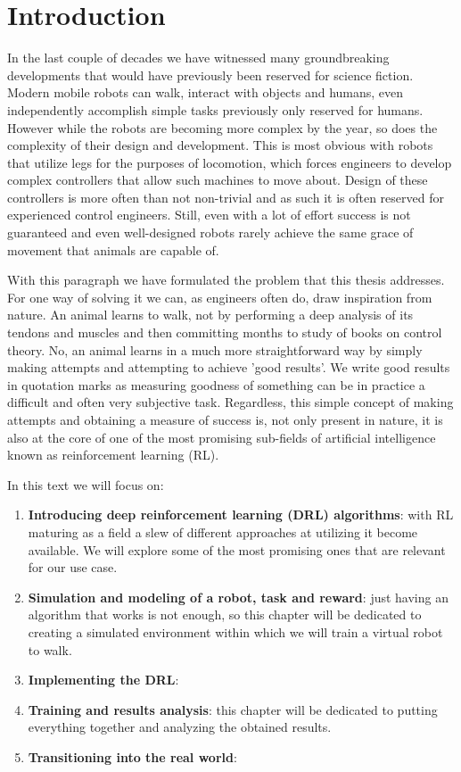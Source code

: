 \chapter{Introduction}


In the last couple of decades we have witnessed many groundbreaking developments that would have previously been reserved for science fiction. Modern mobile robots can walk, interact with objects and humans, even independently accomplish simple tasks previously only reserved for humans. However while the robots are becoming more complex by the year, so does the complexity of their design and development. This is most obvious with robots that utilize legs for the purposes of locomotion, which forces engineers to develop complex controllers that allow such machines to move about. Design of these controllers is more often than not non-trivial and as such it is often reserved for experienced control engineers. Still, even with a lot of effort success is not guaranteed and even well-designed robots rarely achieve the same grace of movement that animals are capable of.

With this paragraph we have formulated the problem that this thesis addresses. For one way of solving it we can, as engineers often do, draw inspiration from nature. An animal learns to walk, not by performing a deep analysis of its tendons and muscles and then committing months to study of books on control theory. No, an animal learns in a much more straightforward way by simply making attempts and attempting to achieve 'good results'. We write good results in quotation marks as measuring goodness of something can be in practice a difficult and often very subjective task. Regardless, this simple concept of making attempts and obtaining a measure of success is, not only present in nature, it is also at the core of one of the most promising sub-fields of artificial intelligence known as reinforcement learning (\ac{RL}). 

\newpage

In this text we will focus on:
\begin{enumerate}[leftmargin=2cm]
\item \textbf{Introducing deep reinforcement learning (\ac{DRL}) algorithms}: with \ac{RL} maturing as a field a slew of different approaches at utilizing it become available. We will explore some of the most promising ones that are relevant for our use case. 
\item \textbf{Simulation and modeling of a robot, task and reward}: just having an algorithm that works is not enough, so this chapter will be dedicated to creating a simulated environment within which we will train a virtual robot to walk.
\item \textbf{Implementing the \ac{DRL}}:  
\item \textbf{Training and results analysis}: this chapter will be dedicated to putting everything together and analyzing the obtained results.
\item \textbf{Transitioning into the real world}: 
\end{enumerate}

